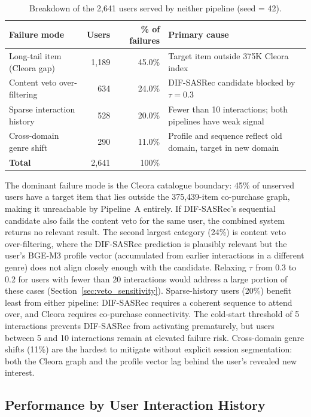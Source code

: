 \begin{table}[H]
\centering
\caption{Breakdown of the 2{,}641 users served by neither pipeline (seed = 42).}
\label{tab:failure_modes}
\begin{tabular}{p{4.4cm} r r p{5.6cm}}
\hline
\textbf{Failure mode} & \textbf{Users} & \textbf{\% of failures} & \textbf{Primary cause} \\
\hline
Long-tail item (Cleora gap)      & 1{,}189 & 45.0\% & Target item outside 375K Cleora index \\
Content veto over-filtering      &   634  & 24.0\% & DIF-SASRec candidate blocked by $\tau = 0.3$ \\
Sparse interaction history       &   528  & 20.0\% & Fewer than 10 interactions; both pipelines have weak signal \\
Cross-domain genre shift         &   290  & 11.0\% & Profile and sequence reflect old domain, target in new domain \\
\hline
\textbf{Total}                   & 2{,}641 & 100\% & \\
\hline
\end{tabular}
\end{table}

The dominant failure mode is the Cleora catalogue boundary: 45\% of unserved users have a target item that lies outside the 375{,}439-item co-purchase graph, making it unreachable by Pipeline~A entirely.
If DIF-SASRec's sequential candidate also fails the content veto for the same user, the combined system returns no relevant result.
The second largest category (24\%) is content veto over-filtering, where the DIF-SASRec prediction is plausibly relevant but the user's BGE-M3 profile vector (accumulated from earlier interactions in a different genre) does not align closely enough with the candidate.
Relaxing $\tau$ from 0.3 to 0.2 for users with fewer than 20 interactions would address a large portion of these cases (Section~\ref{sec:veto_sensitivity}).
Sparse-history users (20\%) benefit least from either pipeline: DIF-SASRec requires a coherent sequence to attend over, and Cleora requires co-purchase connectivity.
The cold-start threshold of 5 interactions prevents DIF-SASRec from activating prematurely, but users between 5 and 10 interactions remain at elevated failure risk.
Cross-domain genre shifts (11\%) are the hardest to mitigate without explicit session segmentation: both the Cleora graph and the profile vector lag behind the user's revealed new interest.

\subsection{Performance by User Interaction History}
\label{sec:perf_by_history}

